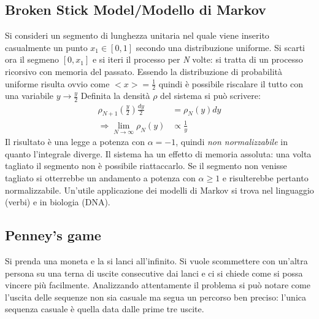 \documentclass[12pt, a4paper]{book}
\theoremstyle{theorem}
\begin{document}
			\subsection{Broken Stick Model/Modello di Markov}
				Si consideri un segmento di lunghezza unitaria nel quale viene inserito casualmente un punto $x_1\in[0,1]$ secondo una distribuzione uniforme.
				Si scarti ora il segmeno $[0,x_1]$ e si iteri il processo per \textit{N} volte: si tratta di un processo ricorsivo con memoria del passato.
				Essendo la distribuzione di probabilità uniforme risulta ovvio come $<x>=\frac{1}{2}$ quindi è possibile riscalare il tutto con una variabile $y\rightarrow\frac{y}{2}$
				Definita la densità $\rho$ del sistema si può scrivere:
				\begin{equation}
					\begin{split}
						\rho_{N+1}\left(\frac{y}{2}\right)\frac{dy}{2}&=\rho_N(y)dy\\
						\Rightarrow\lim_{N\to\infty}\rho_N(y)&\propto\frac{1}{y}
					\end{split}
				\end{equation}
				Il risultato è una legge a potenza con $\alpha=-1$, quindi \textit{non normalizzabile} in quanto l'integrale diverge.
				Il sistema ha un effetto di memoria assoluta: una volta tagliato il segmento non è possibile riattaccarlo.
				Se il segmento non venisse tagliato si otterrebbe un andamento a potenza con $\alpha\geq 1$ e risulterebbe pertanto normalizzabile.
				Un'utile applicazione dei modelli di Markov si trova nel linguaggio (verbi) e in biologia (DNA).
			\subsection{Penney's game}
				Si prenda una moneta e la si lanci all'infinito.
				Si vuole scommettere con un'altra persona su una terna di uscite consecutive dai lanci e ci si chiede come si possa vincere più facilmente.
				Analizzando attentamente il problema si può notare come l'uscita delle sequenze non sia casuale ma segua un percorso ben preciso: l'unica sequenza casuale è quella data dalle prime tre uscite.
							
\end{document}
